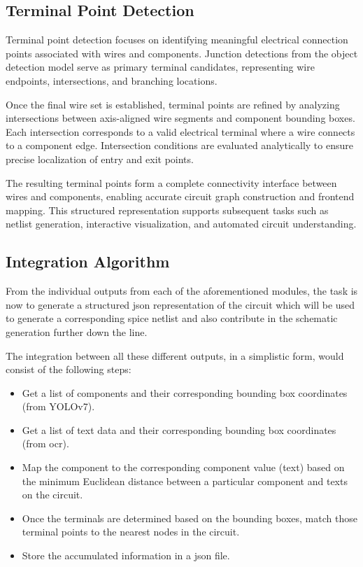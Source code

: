 \subsection{Terminal Point Detection}

Terminal point detection focuses on identifying meaningful electrical connection points associated with wires and components. Junction detections from the object detection model serve as primary terminal candidates, representing wire endpoints, intersections, and branching locations.

Once the final wire set is established, terminal points are refined by analyzing intersections between axis-aligned wire segments and component bounding boxes. Each intersection corresponds to a valid electrical terminal where a wire connects to a component edge. Intersection conditions are evaluated analytically to ensure precise localization of entry and exit points.

The resulting terminal points form a complete connectivity interface between wires and components, enabling accurate circuit graph construction and frontend mapping. This structured representation supports subsequent tasks such as netlist generation, interactive visualization, and automated circuit understanding.

\subsection{Integration Algorithm}

From the individual outputs from each of the aforementioned modules, the task is now to generate a structured \gls{json} representation of the circuit which will be used to generate a corresponding \gls{spice} netlist and also contribute in the schematic generation further down the line.

The integration between all these different outputs, in a simplistic form, would consist of the following steps:

\begin{itemize}
    \item Get a list of components and their corresponding bounding box coordinates (from YOLOv7).
    
    \item Get a list of text data and their corresponding bounding box coordinates (from \gls{ocr}).
    
    \item Map the component to the corresponding component value (text) based on the minimum Euclidean distance between a particular component and texts on the circuit.
    
    \item Once the terminals are determined based on the bounding boxes, match those terminal points to the nearest nodes in the circuit.
    
    \item Store the accumulated information in a \gls{json} file.
\end{itemize}

